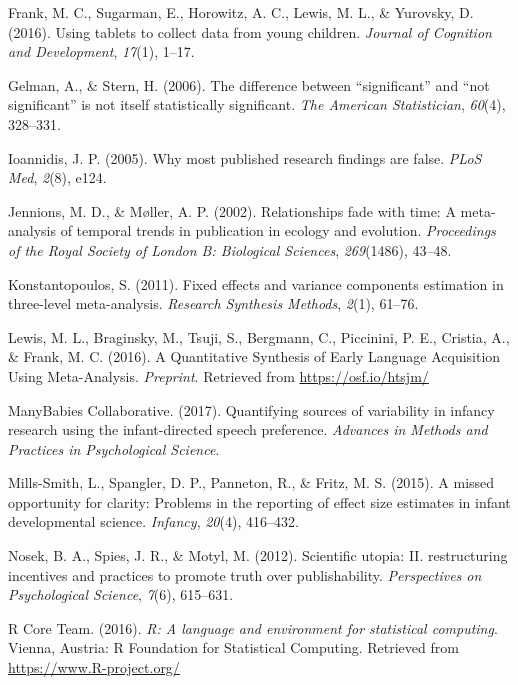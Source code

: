 \documentclass[english,floatsintext,man]{apa6}
\begin{document}
\hypertarget{ref-tablet}{}
Frank, M. C., Sugarman, E., Horowitz, A. C., Lewis, M. L., \& Yurovsky,
D. (2016). Using tablets to collect data from young children.
\emph{Journal of Cognition and Development}, \emph{17}(1), 1--17.

\hypertarget{ref-gelman2006difference}{}
Gelman, A., \& Stern, H. (2006). The difference between ``significant''
and ``not significant'' is not itself statistically significant.
\emph{The American Statistician}, \emph{60}(4), 328--331.

\hypertarget{ref-Ioannidis2005}{}
Ioannidis, J. P. (2005). Why most published research findings are false.
\emph{PLoS Med}, \emph{2}(8), e124.

\hypertarget{ref-jennions2002relationships}{}
Jennions, M. D., \& Møller, A. P. (2002). Relationships fade with time:
A meta-analysis of temporal trends in publication in ecology and
evolution. \emph{Proceedings of the Royal Society of London B:
Biological Sciences}, \emph{269}(1486), 43--48.

\hypertarget{ref-konstantopoulos2011}{}
Konstantopoulos, S. (2011). Fixed effects and variance components
estimation in three-level meta-analysis. \emph{Research Synthesis
Methods}, \emph{2}(1), 61--76.

\hypertarget{ref-SynthesisPaper}{}
Lewis, M. L., Braginsky, M., Tsuji, S., Bergmann, C., Piccinini, P. E.,
Cristia, A., \& Frank, M. C. (2016). A Quantitative Synthesis of Early
Language Acquisition Using Meta-Analysis. \emph{Preprint}. Retrieved
from \url{https://osf.io/htsjm/}

\hypertarget{ref-Manybabies1}{}
ManyBabies Collaborative. (2017). Quantifying sources of variability in
infancy research using the infant-directed speech preference.
\emph{Advances in Methods and Practices in Psychological Science}.

\hypertarget{ref-Mills-Smith2015}{}
Mills-Smith, L., Spangler, D. P., Panneton, R., \& Fritz, M. S. (2015).
A missed opportunity for clarity: Problems in the reporting of effect
size estimates in infant developmental science. \emph{Infancy},
\emph{20}(4), 416--432.

\hypertarget{ref-nosek2012scientific2}{}
Nosek, B. A., Spies, J. R., \& Motyl, M. (2012). Scientific utopia: II.
restructuring incentives and practices to promote truth over
publishability. \emph{Perspectives on Psychological Science},
\emph{7}(6), 615--631.

\hypertarget{ref-R}{}
R Core Team. (2016). \emph{R: A language and environment for statistical
computing}. Vienna, Austria: R Foundation for Statistical Computing.
Retrieved from \url{https://www.R-project.org/}
\end{document}
